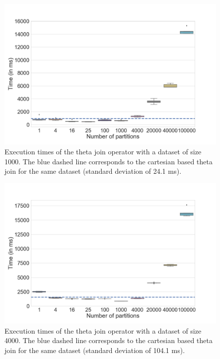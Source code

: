 \documentclass[a4paper,10pt]{IEEEtran}
\begin{document}
\begin{figure}[!ht]
    \centering
    \includegraphics[width=\linewidth]{"theta_1000.png"}
    \caption{Execution times of the theta join operator with a dataset of size 1000. The blue dashed line corresponds to the cartesian based theta join for the same dataset (standard deviation of 24.1 ms).}
    \label{fig:theta-1000}
\end{figure}

\begin{figure}[!ht]
    \centering
    \includegraphics[width=\linewidth]{"theta_4000.png"}
    \caption{Execution times of the theta join operator with a dataset of size 4000. The blue dashed line corresponds to the cartesian based theta join for the same dataset (standard deviation of 104.1 ms).}
    \label{fig:theta-4000}
\end{figure}
\end{document}
